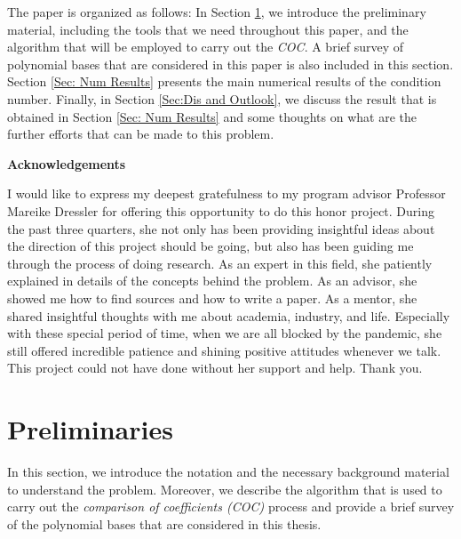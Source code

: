 \documentclass[12pt]{amsart}
\numberwithin{equation}{section}
\theoremstyle{definition}
\numberwithin{thm}{section}
\begin{document}
The paper is organized as follows: In Section \ref{Sec:Preliminaries}, we introduce the preliminary material, 
including the tools that we need throughout this paper, and the algorithm that will be employed to carry out the \emph{COC}.
A brief survey of polynomial bases that are considered in this paper is also included in this section. 
Section \ref{Sec: Num Results} presents the main numerical results of the condition number. 
Finally, in Section \ref{Sec:Dis and Outlook}, we discuss the result that is obtained in Section \ref{Sec: Num Results} and some thoughts on what are the further efforts that can be made to this problem.



\newpage

\centerline{\textbf{Acknowledgements}}

I would like to express my deepest gratefulness to my program advisor Professor Mareike Dressler for offering this opportunity to do this honor project. 
During the past three quarters, she not only has been providing insightful ideas about the direction of this project should be going, 
but also has been guiding me through the process of doing research. 
As an expert in this field, she patiently explained in details of the concepts behind the problem.
As an advisor, she showed me how to find sources and how to write a paper. 
As a mentor, she shared insightful thoughts with me about academia, industry, and life.
Especially with these special period of time, when we are all blocked by the pandemic, 
she still offered incredible patience and shining positive attitudes whenever we talk. 
This project could not have done without her support and help. 
Thank you.

\newpage

\section{Preliminaries}
\label{Sec:Preliminaries}

In this section, we introduce the notation and the necessary background material
to understand the problem. 
Moreover, we describe the algorithm that is used to carry out the \emph{comparison of coefficients (COC)}
process and provide a brief survey of the polynomial bases that are considered in this thesis.

\end{document}
